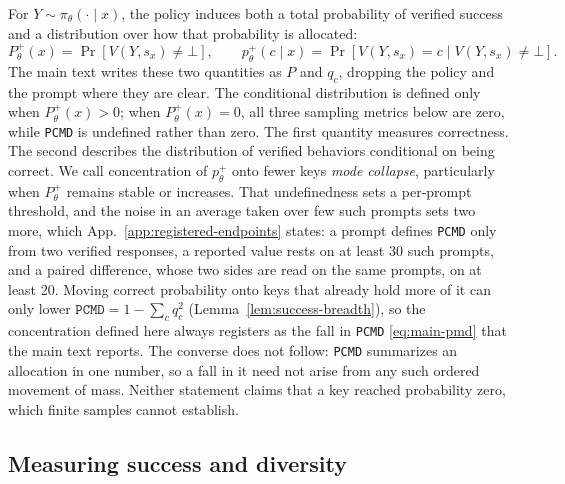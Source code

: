 \documentclass{article}
\newcommand{\1}{\mathbf 1}
\newcommand{\pmd}{\texttt{PCMD}}
\theoremstyle{remark}
\theoremstyle{definition}
\theoremstyle{plain}
\begin{document}
For $Y\sim\pi_\theta(\cdot\mid x)$, the policy induces both a total probability
of verified success and a distribution over how that probability is allocated:
\[
 P_\theta^+(x)=\Pr[V(Y,s_x)\neq\bot],
 \qquad
 p_\theta^+(c\mid x)=\Pr[V(Y,s_x)=c\mid V(Y,s_x)\neq\bot].
\]
The main text writes these two quantities as $P$ and $q_c$, dropping the
policy and the prompt where they are clear.
The conditional distribution is defined only when $P_\theta^+(x)>0$;
when $P_\theta^+(x)=0$, all three sampling metrics below are zero, while
\pmd{} is undefined rather than zero.
The first quantity measures correctness. The second describes the distribution
of verified behaviors conditional on being correct. We call concentration of
$p_\theta^+$ onto fewer keys \emph{mode collapse}, particularly when
$P_\theta^+$ remains stable or increases. That undefinedness sets a per-prompt
threshold, and the noise in an average taken over few such prompts sets two
more, which
App.~\ref{app:registered-endpoints} states: a prompt defines \pmd{} only from
two verified responses, a reported value rests on at least 30 such prompts,
and a paired difference, whose two sides are read on the same prompts, on at
least 20.
Moving correct probability onto keys that already hold more of it can only
lower $\pmd{}=1-\sum_c q_c^2$ (Lemma~\ref{lem:success-breadth}), so the
concentration defined here always registers as the fall in \pmd{}
\eqref{eq:main-pmd} that the main text reports. The converse does not follow:
\pmd{} summarizes an allocation in one number, so a fall in it need not arise
from any such ordered movement of mass. Neither statement claims that a key
reached probability zero, which finite samples cannot establish.

\subsection{Measuring success and diversity}
\label{app:metric-sampling}
\end{document}
